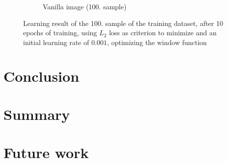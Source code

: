 \documentclass[12pt,a4paper]{article}
\begin{document}
\begin{figure}[h!]
\begin{subfigure}[t]{\size\textwidth}
        \caption{Vanilla image (100. sample)}
        \label{fig:windowII+l2+slow+subset_vanilla100}
    \end{subfigure}
    \caption{Learning result of the 100. sample of the training dataset, after 10 epochs of training, using $L_2$ loss as criterion to minimize and an initial learning rate of $0.001$, optimizing the window function}
    \label{fig:windowII+l2+1000_image100} %
 \end{figure}

\section{Conclusion}
\section{Summary}
\section{Future work}


\end{document}
